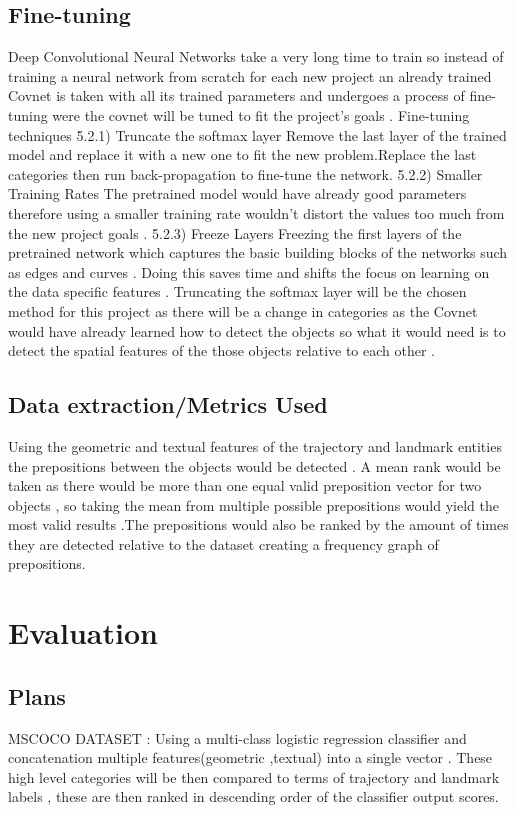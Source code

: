 \documentclass{csfyp}
\begin{document}
\subsection{Fine-tuning}
Deep Convolutional Neural Networks take a very long time to train so instead of training a neural network from scratch for each new project an already trained Covnet is taken with all its trained parameters and undergoes a process of fine-tuning were the covnet will be tuned to fit the project's goals . 
Fine-tuning techniques 
5.2.1) Truncate the softmax layer
Remove the last layer of the trained model and replace it with a new one to fit the new problem.Replace the last categories then run back-propagation to fine-tune the network.
5.2.2) Smaller Training Rates
The pretrained model would have already good parameters therefore using a smaller training rate wouldn’t distort the values too much from the new project goals .
	5.2.3) Freeze Layers
Freezing the first layers of the pretrained network which captures the basic building blocks of the networks such as edges and curves . Doing this saves time and shifts the focus on learning on the data specific features .
Truncating the softmax layer will be the chosen method for this project as there will be a change in categories as the Covnet would have already learned how to detect the objects so what it would need is to detect the spatial features of the those objects relative to each other .

\subsection{Data extraction/Metrics Used}
Using the geometric and textual features of the trajectory and landmark entities the prepositions between the objects would be detected . A mean rank would be taken as there would be more than one equal valid preposition vector for two objects , so taking the mean from multiple possible prepositions would yield the most valid results .The prepositions would also be ranked by the amount of times they are detected relative to the dataset creating a frequency graph of prepositions. 

\section{Evaluation}

\subsection{Plans}
MSCOCO DATASET :
Using a multi-class logistic regression classifier and concatenation multiple features(geometric ,textual) into a single vector . These high level categories will be then compared to terms of trajectory and landmark labels , these are then ranked in descending order of the classifier output scores. 
\end{document}
